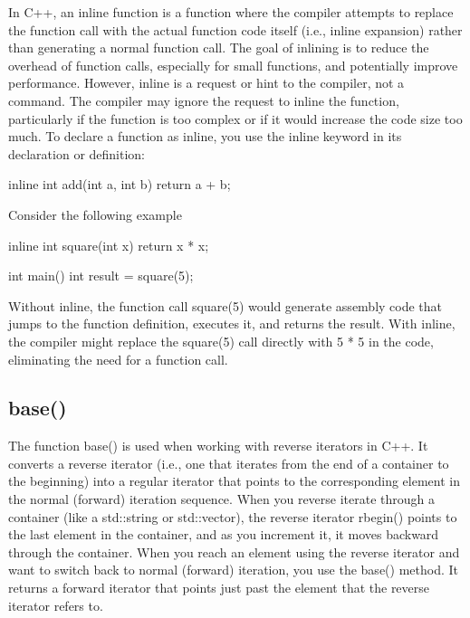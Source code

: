 \documentclass{report}
\begin{document}
    \pagebreak 
    \bigbreak \noindent 
    In C++, an inline function is a function where the compiler attempts to replace the function call with the actual function code itself (i.e., inline expansion) rather than generating a normal function call. The goal of inlining is to reduce the overhead of function calls, especially for small functions, and potentially improve performance.
    \bigbreak \noindent 
    However, inline is a request or hint to the compiler, not a command. The compiler may ignore the request to inline the function, particularly if the function is too complex or if it would increase the code size too much.
    \bigbreak \noindent 
    To declare a function as inline, you use the inline keyword in its declaration or definition:
    \bigbreak \noindent 
    \begin{cppcode}
        inline int add(int a, int b) {
            return a + b;
        }
    \end{cppcode}
    \bigbreak \noindent 
    Consider the following example
    \bigbreak \noindent 
    \begin{cppcode}
        inline int square(int x) {
            return x * x;
        }

        int main() {
            int result = square(5);
        }
    \end{cppcode}
    \bigbreak \noindent 
    Without inline, the function call square(5) would generate assembly code that jumps to the function definition, executes it, and returns the result. With inline, the compiler might replace the square(5) call directly with 5 * 5 in the code, eliminating the need for a function call.

    \pagebreak 
    \bigbreak \noindent 
    \subsection{base()}
    \bigbreak \noindent 
    The function base() is used when working with reverse iterators in C++. It converts a reverse iterator (i.e., one that iterates from the end of a container to the beginning) into a regular iterator that points to the corresponding element in the normal (forward) iteration sequence.
    \bigbreak \noindent 
    When you reverse iterate through a container (like a std::string or std::vector), the reverse iterator rbegin() points to the last element in the container, and as you increment it, it moves backward through the container. When you reach an element using the reverse iterator and want to switch back to normal (forward) iteration, you use the base() method. It returns a forward iterator that points just past the element that the reverse iterator refers to.
\end{document}
